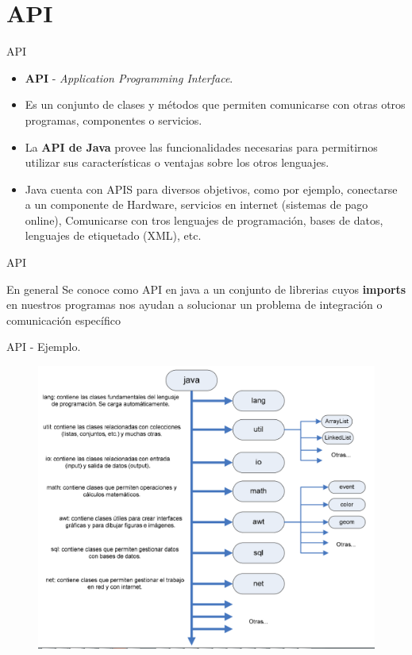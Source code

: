 \section{API}
\begin{frame}{API}
\begin{itemize}{}
\item \textbf{API} - \textit{Application Programming Interface}.
\item Es un conjunto de clases y m\'etodos que permiten comunicarse con otras otros programas, componentes o servicios.
\item La \textbf{API de Java} provee las funcionalidades necesarias para permitirnos utilizar sus caracter\'isticas o ventajas sobre los otros lenguajes.
\item Java cuenta con APIS para diversos objetivos, como por ejemplo, conectarse a un componente de Hardware, servicios en internet (sistemas de pago online), Comunicarse con tros lenguajes de programaci\'on, bases de datos, lenguajes de etiquetado (XML), etc.
\end{itemize}
\end{frame}

\begin{frame}{API}

\begin{block}{En general}
  Se conoce como API en java a un conjunto de librerias cuyos \textbf{imports} en nuestros programas nos ayudan a solucionar un problema de integraci\'on o comunicaci\'on espec\'ifico
\end{block}

\end{frame}


\begin{frame}{API - Ejemplo.}
  \begin{figure}
    \includegraphics[scale=0.3]{figuras/API_Java.PNG}
  \end{figure}
\end{frame}

